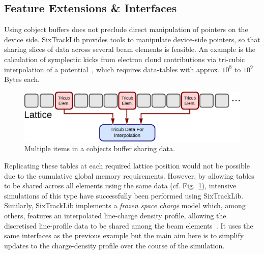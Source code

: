 \documentclass[a4paper,
               refpage,       %
               keeplastbox,   %
               ]{jacow}
\begin{document}
\subsection{Feature Extensions \& Interfaces}
Using cobject buffers does not preclude direct manipulation of pointers on the device side. SixTrackLib provides tools to manipulate device-side pointers, so that sharing slices of data across several beam elements is feasible. An example is the calculation of symplectic kicks from electron cloud contributions via tri-cubic interpolation of a potential~\cite{kparaschou-2020}, which requires data-tables with approx. $10^8$ to $10^9$ Bytes each. 
\begin{figure}[!hbt]
    \centering
    \includegraphics*[width=.9\columnwidth]{fig_be_external_data}
    \caption{Multiple items in a cobjects buffer sharing data.}
    \label{fig:be_external_data}
\end{figure}
Replicating these tables at each required lattice position would not be possible due to the cumulative global memory requirements. However, by allowing tables to be shared across all elements using the same data (cf. Fig.~\ref{fig:be_external_data}), intensive simulations of this type have successfully been performed using SixTrackLib.
Similarly, SixTrackLib implements a \textit{frozen space charge} model which, among others, features an interpolated line-charge density profile, allowing the discretised line-profile data to be shared among the beam elements~\cite{aoeftiger-2021}. It uses the same interfaces as the previous example but the main aim here is to simplify updates to the charge-density profile over the course of the simulation.
\end{document}
